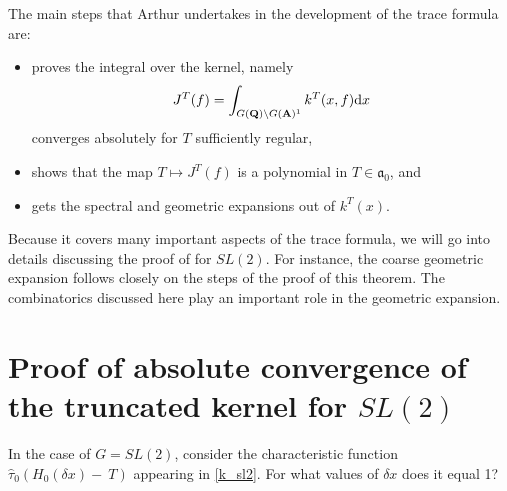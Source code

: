 \documentclass{ims9x6}
\def\A{\mathbf A}
\def\Q{\mathbf Q}
\def\aaa{\mathfrak a}
\def\d{\text d}
\def\bs{\setminus}
\begin{document}
The main steps that Arthur undertakes in the development of the trace formula are:
\begin{itemize}
	\item proves the integral over the kernel, namely
			\[ J^T(f) = \int_{G(\Q) \bs G(\A)^1} k^T(x, f) \d x \]
			converges absolutely for $T$ sufficiently regular,
	\item shows that the map $T \mapsto J^T(f)$ is a polynomial in $T \in \aaa_0$, and
	\item gets the spectral and geometric expansions out of $k^T(x)$. 
\end{itemize}
Because it covers many important aspects of the trace formula, we will go into details discussing the proof of \cite[Theorem~6.1]{clay} for $SL(2)$. For instance, the coarse geometric expansion follows closely on the steps of the proof of this theorem. The combinatorics discussed here play an important role in the geometric expansion. 

\section{Proof of absolute convergence of the truncated kernel for $SL(2)$} \label{6.1proof}

In the case of $G = SL(2)$, consider the characteristic function $\hat\tau_0(H_0(\delta x)-~T)$ appearing in \cref{k_sl2}. For what values of $\delta x$ does it equal 1?
\end{document}
